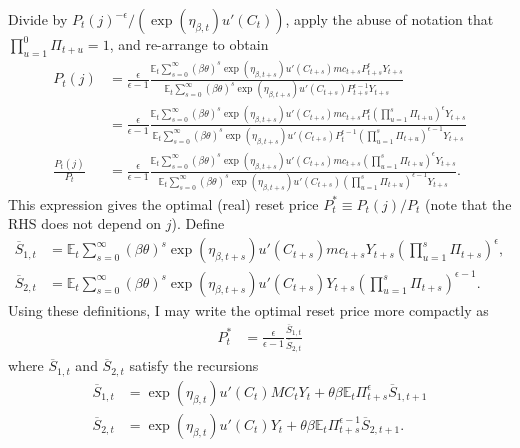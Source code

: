 \documentclass[12 pt, oneside]{article}
\theoremstyle{definition}
\theoremstyle{definition}
\theoremstyle{definition}
\newcommand{\E}{\mathbb{E}}
\begin{document}
Divide by $P_t(j)^{-\epsilon} / (\exp(\eta_{\beta, t})u'(C_t))$, apply the abuse of notation that $\prod_{u = 1}^0 \Pi_{t + u} = 1$, and re-arrange to obtain
\begin{align*}
  P_t(j) & = \frac{\epsilon}{\epsilon - 1}\frac{\E_t\sum_{s = 0}^\infty (\beta\theta)^s \exp(\eta_{\beta, t + s})u'(C_{t + s}) mc_{t + s}P_{t + s}^{\epsilon}Y_{t + s}}{\E_t\sum_{s = 0}^\infty (\beta\theta)^s \exp(\eta_{\beta, t + s})u'(C_{t + s})P_{t + s}^{\epsilon - 1}Y_{t + s}}\\
         & = \frac{\epsilon}{\epsilon - 1}\frac{\E_t\sum_{s = 0}^\infty (\beta\theta)^s \exp(\eta_{\beta, t + s})u'(C_{t + s}) mc_{t + s}P_t^\epsilon\left(\prod_{u = 1}^s\Pi_{t + u}\right)^{\epsilon}Y_{t + s}}{\E_t\sum_{s = 0}^\infty (\beta\theta)^s \exp(\eta_{\beta, t + s})u'(C_{t + s})P_t^{\epsilon - 1}\left(\prod_{u = 1}^s\Pi_{t + u}\right)^{\epsilon - 1}Y_{t + s}}\\
  \frac{P_t(j)}{P_t} & = \frac{\epsilon}{\epsilon - 1}\frac{\E_t\sum_{s = 0}^\infty (\beta\theta)^s \exp(\eta_{\beta, t + s})u'(C_{t + s}) mc_{t + s}\left(\prod_{u = 1}^s\Pi_{t + u}\right)^{\epsilon}Y_{t + s}}{\E_t\sum_{s = 0}^\infty (\beta\theta)^s \exp(\eta_{\beta, t + s})u'(C_{t + s})\left(\prod_{u = 1}^s\Pi_{t + u}\right)^{\epsilon - 1}Y_{t + s}}.
\end{align*}
This expression gives the optimal (real) reset price $P_t^* \equiv P_t(j) / P_t $ (note that the RHS does not depend on $j$).
Define
\begin{align}
  \overline{S}_{1, t} & = \E_t\sum_{s = 0}^\infty  (\beta\theta)^s \exp(\eta_{\beta, t + s})u'(C_{t + s}) mc_{t + s}Y_{t + s}\left( \prod_{u = 1}^s\Pi_{t + s}\right)^{\epsilon},\\
  \overline{S}_{2, t}  & = \E_t\sum_{s = 0}^\infty (\beta\theta)^s \exp(\eta_{\beta, t + s})u'(C_{t + s})Y_{t + s}\left(\prod_{u = 1}^s\Pi_{t + s}\right)^{\epsilon - 1}.
\end{align}
Using these definitions, I may write the optimal reset price more compactly as
\begin{align}
  P_t^* & = \frac{\epsilon}{\epsilon - 1}\frac{\overline{S}_{1, t}}{\overline{S}_{2, t}}
\end{align}
where $\overline{S}_{1, t}$ and $\overline{S}_{2, t}$ satisfy the recursions
\begin{align*}
  \overline{S}_{1, t} & = \exp(\eta_{\beta, t})u'(C_t) MC_t Y_t + \theta \beta \E_t\Pi_{t + s}^\epsilon \overline{S}_{1, t + 1}\\
  \overline{S}_{2, t} & = \exp(\eta_{\beta, t})u'(C_t) Y_t + \theta \beta \E_t \Pi_{t + s}^{\epsilon - 1}\overline{S}_{2, t + 1}.
\end{align*}
\end{document}
